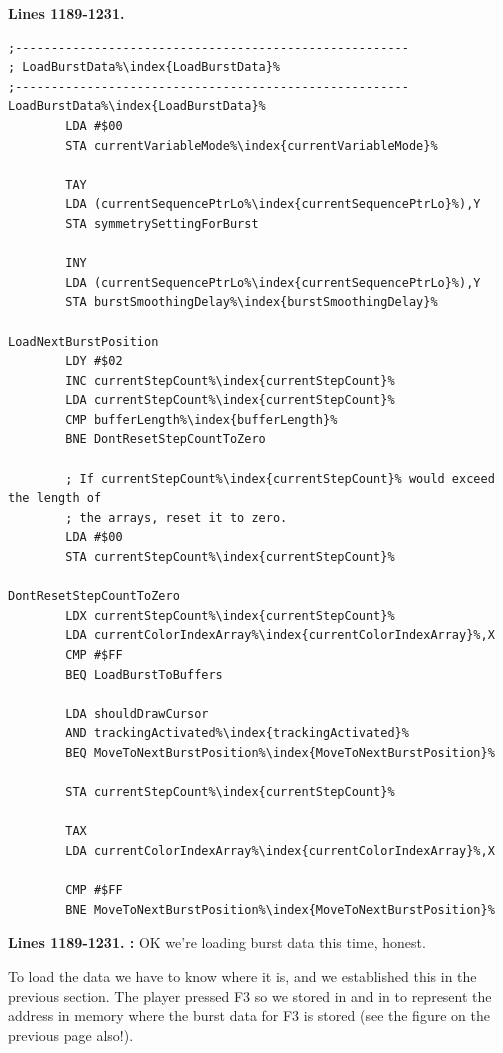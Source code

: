 \clearpage
\textbf{Lines 1189-1231. }
\begin{lstlisting}[escapechar=\%]
;-------------------------------------------------------
; LoadBurstData%\index{LoadBurstData}%
;-------------------------------------------------------
LoadBurstData%\index{LoadBurstData}%    
        LDA #$00
        STA currentVariableMode%\index{currentVariableMode}%

        TAY 
        LDA (currentSequencePtrLo%\index{currentSequencePtrLo}%),Y
        STA symmetrySettingForBurst

        INY 
        LDA (currentSequencePtrLo%\index{currentSequencePtrLo}%),Y
        STA burstSmoothingDelay%\index{burstSmoothingDelay}%

LoadNextBurstPosition    
        LDY #$02
        INC currentStepCount%\index{currentStepCount}%
        LDA currentStepCount%\index{currentStepCount}%
        CMP bufferLength%\index{bufferLength}%
        BNE DontResetStepCountToZero

        ; If currentStepCount%\index{currentStepCount}% would exceed the length of
        ; the arrays, reset it to zero.
        LDA #$00
        STA currentStepCount%\index{currentStepCount}%

DontResetStepCountToZero
        LDX currentStepCount%\index{currentStepCount}%
        LDA currentColorIndexArray%\index{currentColorIndexArray}%,X
        CMP #$FF
        BEQ LoadBurstToBuffers

        LDA shouldDrawCursor
        AND trackingActivated%\index{trackingActivated}%
        BEQ MoveToNextBurstPosition%\index{MoveToNextBurstPosition}%

        STA currentStepCount%\index{currentStepCount}%

        TAX 
        LDA currentColorIndexArray%\index{currentColorIndexArray}%,X

        CMP #$FF
        BNE MoveToNextBurstPosition%\index{MoveToNextBurstPosition}%

\end{lstlisting}
\clearpage

\textbf{Lines 1189-1231. :} OK we're loading burst data this time, honest.

To load the data we have to know where it is, and we established this in the previous section. The player
pressed F3 so we stored  in  and  in 
to represent the address  in memory where the burst data for F3 is stored (see the figure on the previous
page also!).

